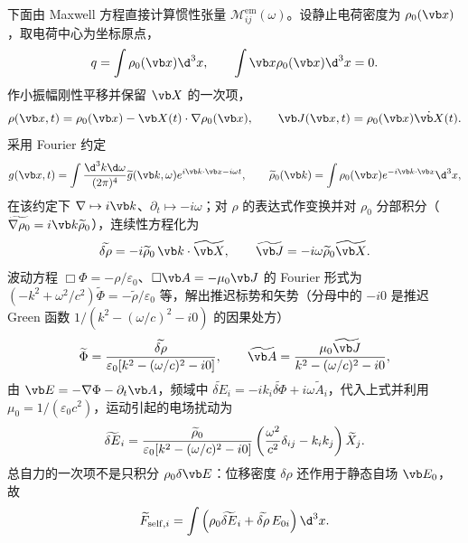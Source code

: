 下面由 Maxwell 方程直接计算惯性张量 $\mathcal M_{ij}^{\mathrm{em}}(\omega)$。设静止电荷密度为 $\rho_0(\vb x)$，取电荷中心为坐标原点，
\begin{equation*}
 q=\int\rho_0(\vb x)\d^3x,
 \qquad
 \int\vb x\rho_0(\vb x)\d^3x=0.
\end{equation*}
作小振幅刚性平移并保留 $\vb X$ 的一次项，
\begin{equation*}
 \rho(\vb x,t)
 =\rho_0(\vb x)-\vb X(t)\cdot\nabla\rho_0(\vb x),
 \qquad
 \vb J(\vb x,t)=\rho_0(\vb x)\dot{\vb X}(t).
\end{equation*}
采用 Fourier 约定
\begin{equation*}
 g(\vb x,t)=\int{\d^3k\d\omega\over(2\pi)^4}
 \widetilde g(\vb k,\omega)e^{i\vb k\cdot\vb x-i\omega t},
 \qquad
 \widetilde\rho_0(\vb k)=\int\rho_0(\vb x)e^{-i\vb k\cdot\vb x}\d^3x,
\end{equation*}
在该约定下 $\nabla\mapsto i\vb k$、$\partial_t\mapsto -i\omega$；对 $\rho$ 的表达式作变换并对 $\rho_0$ 分部积分（$\widetilde{\nabla\rho_0}=i\vb k\widetilde\rho_0$），连续性方程化为
\begin{equation*}
 \widetilde{\delta\rho}
 =-i\widetilde\rho_0\,\vb k\cdot\widetilde{\vb X},
 \qquad
 \widetilde{\vb J}
 =-i\omega\widetilde\rho_0\widetilde{\vb X}.
\end{equation*}
波动方程 $\Box\Phi=-\rho/\varepsilon_0$、$\Box\vb A=-\mu_0\vb J$ 的 Fourier 形式为 $(-k^2+\omega^2/c^2)\widetilde\Phi=-\widetilde\rho/\varepsilon_0$ 等，解出推迟标势和矢势（分母中的 $-i0$ 是推迟 Green 函数 $1/(k^2-(\omega/c)^2-i0)$ 的因果处方）
\begin{equation*}
 \widetilde\Phi
 ={\widetilde{\delta\rho}\over
 \varepsilon_0[k^2-(\omega/c)^2-i0]},
 \qquad
 \widetilde{\vb A}
 ={\mu_0\widetilde{\vb J}\over
 k^2-(\omega/c)^2-i0},
\end{equation*}
由 $\vb E=-\nabla\Phi-\partial_t\vb A$，频域中 $\widetilde{\delta E}_i=-ik_i\widetilde{\delta\Phi}+i\omega\widetilde A_i$，代入上式并利用 $\mu_0=1/(\varepsilon_0c^2)$，运动引起的电场扰动为
\begin{equation*}
 \widetilde{\delta E}_i
 ={\widetilde\rho_0\over\varepsilon_0[k^2-(\omega/c)^2-i0]}
 \left({\omega^2\over c^2}\delta_{ij}-k_i k_j\right)
 \widetilde X_j.
\end{equation*}
总自力的一次项不是只积分 $\rho_0\delta\vb E$：位移密度 $\delta\rho$ 还作用于静态自场 $\vb E_0$，故
\begin{equation*}
 \widetilde F_{\mathrm{self},i}
 =\int\left(\rho_0\widetilde{\delta E}_i
 +\widetilde{\delta\rho}\,E_{0i}\right)\d^3x.
\end{equation*}
